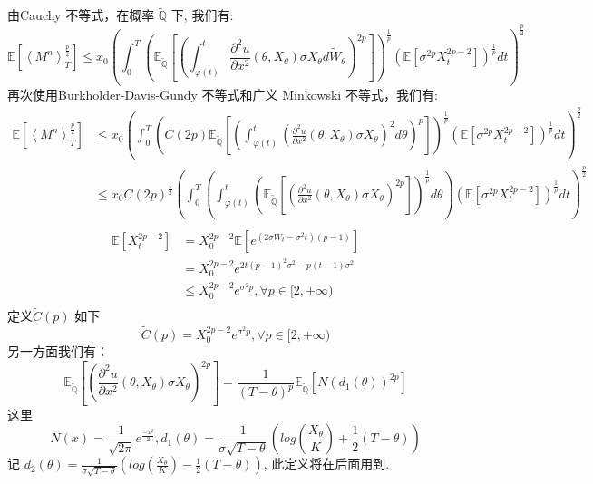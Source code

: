 由Cauchy 不等式，在概率 $\widetilde{\mathbb{Q}}$ 下, 我们有:
\begin{equation}
\mathbb{E}[\left \langle M^n \right \rangle_T^{\frac{p}{2}}]\leq x_0
(\int_0^T(\mathbb{E}_{\widetilde{\mathbb{Q}}}[(\int_{\varphi(t)}^t \frac{\partial^2 u}{\partial x^2}(\theta, X_\theta)\sigma X_\theta d\widetilde{W}_\theta)^{2p}])^{\frac{1}{p}}(\mathbb{E}[\sigma^{2p} X_t^{2p-2}] )^{\frac{1}{p}}dt)^{\frac{p}{2}}
\end{equation}
再次使用Burkholder-Davis-Gundy 不等式和广义 Minkowski 不等式，我们有:
\begin{equation}
\begin{split}
\mathbb{E}[\left \langle M^n \right \rangle_T^{\frac{p}{2}}]&\leq x_0
(\int_0^T(C(2p)\mathbb{E}_{\widetilde{\mathbb{Q}}}[(\int_{\varphi(t)}^t (\frac{\partial^2 u}{\partial x^2}(\theta, X_\theta)\sigma X_\theta)^2 d\theta)^{p}])^{\frac{1}{p}}(\mathbb{E}[\sigma^{2p} X_t^{2p-2}] )^{\frac{1}{p}}dt)^{\frac{p}{2}}\\
&\leq x_0C(2p)^{\frac{1}{2}}(\int_0^T(\int_{\varphi(t)}^t(\mathbb{E}_{\widetilde{\mathbb{Q}}}[ (\frac{\partial^2 u}{\partial x^2}(\theta, X_\theta)\sigma X_\theta)^{2p}])^{\frac{1}{p}} d\theta)(\mathbb{E}[\sigma^{2p} X_t^{2p-2}] )^{\frac{1}{p}}dt)^{\frac{p}{2}}\\
\end{split}
\end{equation}
\begin{equation}
\begin{split}
\mathbb{E}[X_t^{2p-2}]&=X_0^{2p-2}\mathbb{E}[e^{(2\sigma W_t-\sigma^2t)(p-1)}]\\
&=X_0^{2p-2}e^{2t(p-1)^2\sigma^2-p(t-1)\sigma^2}\\
&\leq
X_0^{2p-2}e^{\sigma^2p}, \forall p\in [2, +\infty)\\
\end{split}
\end{equation}
定义$\widetilde{C}(p)$ 如下 
\begin{equation}
\widetilde{C}(p)=
X_0^{2p-2}e^{\sigma^2p}, \forall p\in  [2, +\infty)
\end{equation}
另一方面我们有：
\begin{equation}
\mathbb{E}_{\widetilde{\mathbb{Q}}}[ (\frac{\partial^2 u}{\partial x^2}(\theta, X_\theta)\sigma X_\theta)^{2p}]=\frac{1}{(T-\theta)^p}\mathbb{E}_{\widetilde{\mathbb{Q}}}[N(d_1(\theta))^{2p}]
\end{equation}
这里
\begin{equation}
N(x)=\frac{1}{\sqrt{2\pi}}e^{\frac{-x^2}{2}}, d_1(\theta)=\frac{1}{\sigma\sqrt{T-\theta}}(log(\frac{X_\theta}{K})+\frac{1}{2}(T-\theta))
\end{equation}
记 $d_2(\theta)=\frac{1}{\sigma\sqrt{T-\theta}}(log(\frac{X_\theta}{K})-\frac{1}{2}(T-\theta))$, 此定义将在后面用到.

